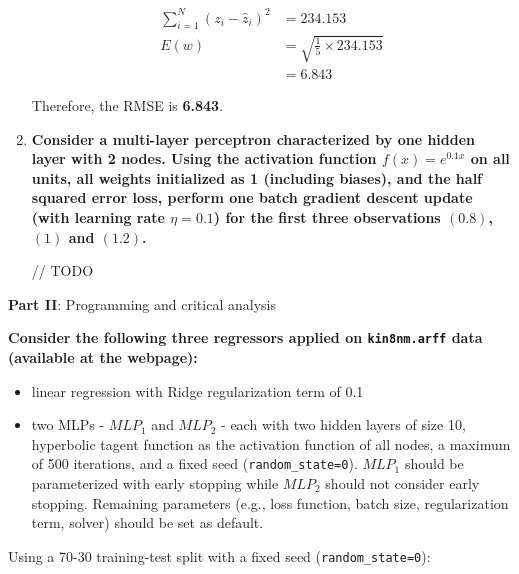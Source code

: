 \documentclass[12pt]{article}
\begin{document}
\begin{enumerate}[leftmargin=\labelsep]
          $$
              \begin{aligned}
                  \sum_{i = 1}^{N} (z_i - \hat{z}_i)^2 & = 234.153                           \\
                  E(w)                                 & = \sqrt{\frac{1}{5} \times 234.153} \\
                                                       & = 6.843
              \end{aligned}
          $$

          Therefore, the RMSE is \textbf{6.843}.

    \item {\color{questioncolor}\bfseries
          Consider a multi-layer perceptron characterized by one hidden layer with 2 nodes.
          Using the activation function $f(x) = e^{0.1 x}$ on all units, all weights
          initialized as 1 (including biases), and the half squared error loss,
          perform one batch gradient descent update (with learning rate $\eta = 0.1$)
          for the first three observations $(0.8)$, $(1)$ and $(1.2)$.
          }\\
          \vspace{0.5em}

          // TODO
\end{enumerate}

\pagebreak

\begin{center}
    \large{\textbf{Part II}: Programming and critical analysis}
\end{center}

{\color{questioncolor}\bfseries
\noindent
Consider the following three regressors applied on \texttt{kin8nm.arff} data
(available at the webpage):
\begin{itemize}
    \item linear regression with Ridge regularization term of 0.1
    \item two MLPs - $MLP_1$ and $MLP_2$ - each with two hidden layers of
          size 10, hyperbolic tagent function as the activation function of all nodes,
          a maximum of 500 iterations, and a fixed seed (\texttt{random\_state=0}).
          $MLP_1$ should be parameterized with early stopping while $MLP_2$ should not
          consider early stopping.
          Remaining parameters (e.g., loss function, batch size, regularization term,
          solver) should be set as default.
\end{itemize}
Using a 70-30 training-test split with a fixed seed (\texttt{random\_state=0}):
}
\end{document}
